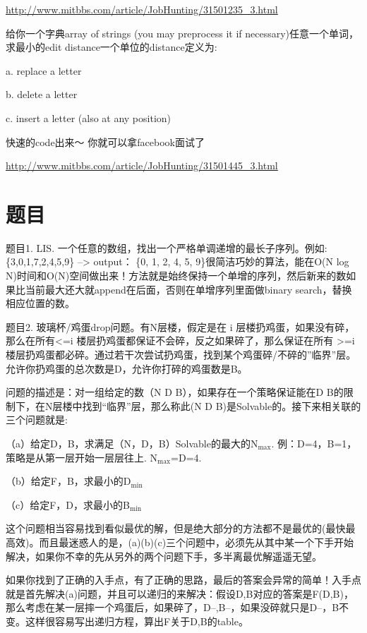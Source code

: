 \documentclass[12pt]{book}
\begin{document}
\url{http://www.mitbbs.com/article/JobHunting/31501235_3.html}

给你一个字典array of strings (you may preprocess it if necessary)任意一个单词，求最小的edit distance一个单位的distance定义为:

a. replace a letter

b. delete a letter

c. insert a letter (also at any position)

快速的code出来～ 你就可以拿facebook面试了

\url{http://www.mitbbs.com/article/JobHunting/31501445_3.html}

\section{题目}
\label{sec-26-2}

题目1. LIS. 一个任意的数组，找出一个严格单调递增的最长子序列。例如: \{3,0,1,7,2,4,5,9\} –> output： \{0, 1, 2, 4, 5, 9\}很简洁巧妙的算法，能在O(N log N)时间和O(N)空间做出来！方法就是始终保持一个单增的序列，然后新来的数如果比当前最大还大就append在后面，否则在单增序列里面做binary search，替换相应位置的数。

题目2. 玻璃杯/鸡蛋drop问题。有N层楼，假定是在 i 层楼扔鸡蛋，如果没有碎，那么在所有<=i 楼层扔鸡蛋都保证不会碎，反之如果碎了，那么保证在所有 >=i 楼层扔鸡蛋都必碎。通过若干次尝试扔鸡蛋，找到某个鸡蛋碎/不碎的”临界”层。允许你扔鸡蛋的总次数是D，允许你打碎的鸡蛋数是B。

问题的描述是：对一组给定的数（N D B），如果存在一个策略保证能在D B的限制下，在N层楼中找到“临界”层，那么称此(N D B)是Solvable的。接下来相关联的三个问题就是:

（a）给定D，B，求满足（N，D，B）Solvable的最大的N$_{\text{max}}$. 例：D=4，B=1， 策略是从第一层开始一层层往上. N$_{\text{max}}$=D=4.

（b）给定F，B，求最小的D$_{\text{min}}$

（c）给定F，D，求最小的B$_{\text{min}}$

这个问题相当容易找到看似最优的解，但是绝大部分的方法都不是最优的(最快最高效)。而且最迷惑人的是，(a)(b)(c)三个问题中，必须先从其中某一个下手开始解决，如果你不幸的先从另外的两个问题下手，多半离最优解遥遥无望。

如果你找到了正确的入手点，有了正确的思路，最后的答案会异常的简单！入手点就是首先解决(a)问题，并且可以递归的来解决：假设D,B对应的答案是F(D,B)，那么考虑在某一层摔一个鸡蛋后，如果碎了，D--,B--，如果没碎就只是D--，B不变。这样很容易写出递归方程，算出F关于D,B的table。
\end{document}
